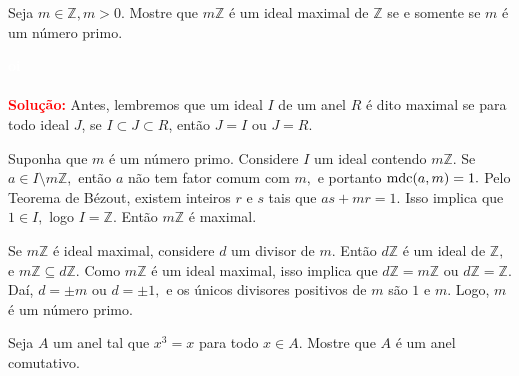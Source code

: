 \documentclass[11pt,a4paper]{article}
\newcounter{exercicio}[section]
\newcommand{\solucao}[1]{
\textbf{\textcolor{white}{oi}\\ \\ \textcolor{red}{Solução:}} #1}
\begin{document}
  Seja $m \in \mathbb{Z}, m > 0.$ Mostre que $m\mathbb{Z}$ é um ideal maximal de $\mathbb{Z}$ se e somente se $m$ é um número primo.
\solucao{
Antes, lembremos que um ideal $I$ de um anel $R$ é dito maximal se para todo ideal $J$, se $I \subset J \subset R$, então $J = I$ ou $J = R.$ 

Suponha que $m$ é um número primo. Considere $I$ um ideal contendo $m \mathbb{Z}.$ Se $a \in I \setminus m \mathbb{Z},$ então $a$ não tem fator comum com $m,$ e portanto ${\rm mdc}(a,m) = 1.$ Pelo Teorema de Bézout, existem inteiros $r$ e $s$ tais que $as + mr = 1. $ Isso implica que $1 \in I,$ logo $I = \mathbb{Z}.$ Então $m \mathbb{Z}$ é maximal.

Se $m \mathbb{Z}$ é ideal maximal, considere $d$ um divisor de $m.$ Então $d \mathbb{Z}$ é um ideal de $\mathbb{Z},$ e $m \mathbb{Z} \subseteq d \mathbb{Z}.$ Como $m \mathbb{Z}$ é um ideal maximal, isso implica que $d \mathbb{Z} = m \mathbb{Z}$ ou $d \mathbb{Z} = \mathbb{Z}.$ Daí, $d = \pm m$ ou $d = \pm 1,$ e os únicos divisores positivos de $m$ são $1$ e $m.$ Logo, $m$ é um número primo.
}
 Seja $A$ um anel tal que $x^3 = x$ para todo $x \in A.$ Mostre que $A$ é um anel comutativo.
\end{document}
